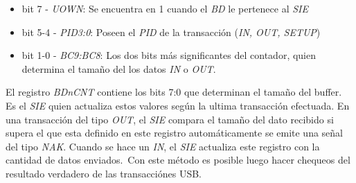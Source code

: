 \begin{itemize}
 \item bit 7 - \emph{UOWN}: Se encuentra en 1 cuando el \emph{BD} le pertenece
al \emph{SIE}

 \item bit 5-4 - \emph{PID3:0}: Poseen el \emph{PID} de la transacci\'on
(\emph{IN, OUT, SETUP})

 \item bit 1-0 - \emph{BC9:BC8}: Los dos bits m\'as significantes del
contador, quien determina el tama\~no del los datos \emph{IN} o \emph{OUT}.
\end{itemize}

El registro \emph{BDnCNT} contiene los bits 7:0 que determinan el tama\~no del
buffer. Es el \emph{SIE} quien actualiza estos valores seg\'un la ultima
transacci\'on efectuada. En una transacci\'on del tipo \emph{OUT}, el
\emph{SIE} compara el tama\~no del dato recibido si supera el que esta
definido en este registro autom\'aticamente se emite una se\~nal del tipo
\emph{NAK}. Cuando se hace un \emph{IN}, el \emph{SIE} actualiza este registro
con la cantidad de datos enviados.\
Con este m\'etodo es posible luego hacer chequeos del resultado verdadero de
las transacci\'ones USB. 


